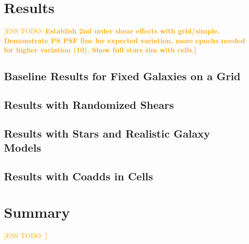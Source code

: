 \documentclass[iop, twocolappendix, appendixfloats, numberedappendix, apj]{hackemulateapj}
\newcommand{\esstodo}[1]{\textcolor{orange}{[ESS TODO: \bf #1]}}
\newcommand{\descwl}{\texttt{WeakLensingDeblending}}
\begin{document}
\section{Results} \label{sec:results}

\esstodo{Establish 2nd order shear effects with grid/simple.  Demonstrate PS PSF fine for expected variation, more epochs needed for higher variation (10). Show full stars sim with cells.}

\subsection{Baseline Results for Fixed Galaxies on a Grid} \label{sec:results:secondorder}

\subsection{Results with Randomized Shears} \label{sec:results:randshear}

\subsection{Results with Stars and Realistic Galaxy Models} \label{sec:results:full}

\subsection{Results with Coadds in Cells} \label{sec:results:cells}


\section{Summary} \label{sec:summary}

\esstodo{}

% 

\end{document}
